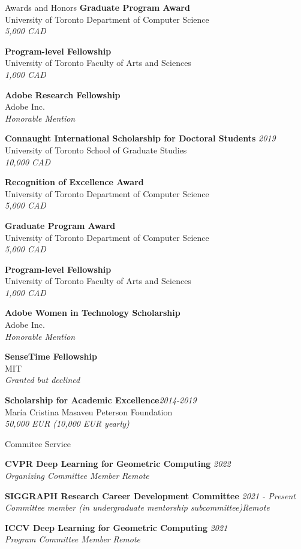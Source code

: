\documentclass{resume} %
\begin{document}
\begin{rSection}{Awards and Honors}
{\bf Graduate Program Award}\\ 
University of Toronto Department of Computer Science\\
{\it 5,000 CAD}

{\bf Program-level Fellowship} \\ 
University of Toronto Faculty of Arts and Sciences\\
{\it 1,000 CAD}

{\bf Adobe Research Fellowship}  \\ 
Adobe Inc.\\
{\it Honorable Mention}

{\bf Connaught International Scholarship for Doctoral Students} \hfill {\em 2019} \\ 
University of Toronto School of Graduate Studies\\
{\it 10,000 CAD}

{\bf Recognition of Excellence Award}  \\ 
University of Toronto Department of Computer Science\\
{\it 5,000 CAD}

{\bf Graduate Program Award}\\ 
University of Toronto Department of Computer Science\\
{\it 5,000 CAD}

{\bf Program-level Fellowship} \\ 
University of Toronto Faculty of Arts and Sciences\\
{\it 1,000 CAD}

{\bf Adobe Women in Technology Scholarship} \\ 
Adobe Inc.\\
{\it Honorable Mention}

{\bf SenseTime Fellowship}  \\ 
MIT\\
{\it Granted but declined}

{\bf  Scholarship for Academic Excellence}\hfill {\em 2014-2019} \\ 
Mar\'{i}a Cristina Masaveu Peterson Foundation\\
{\it 50,000 EUR (10,000 EUR yearly)}

\end{rSection}

\begin{rSection}{Commitee Service}

{\bf CVPR Deep Learning for Geometric Computing} \hfill {\em 2022}\\ 
{\it Organizing Committee Member} \hfill {\em Remote}

{\bf SIGGRAPH Research Career Development Committee} \hfill {\em 2021 - Present}\\ 
{\it Committee member (in undergraduate mentorship subcommittee)}\hfill {\em Remote}

{\bf ICCV Deep Learning for Geometric Computing} \hfill {\em 2021}\\ 
{\it Program Committee Member} \hfill {\em Remote}

\end{rSection}
\end{document}
